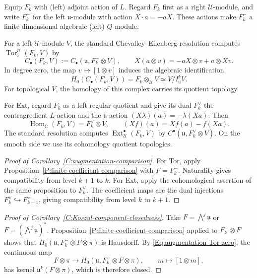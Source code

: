 \documentclass[a4paper,12pt]{amsart}
\numberwithin{equation}{section}
\theoremstyle{plain}
\theoremstyle{definition}
\theoremstyle{remark}
\begin{document}
Equip $F_k$ with (left) adjoint action of $L$.
Regard $F_k$ first as a right $\mathscr U$-module, and write $F_k^-$ for the left $\mathfrak u$-module with action $X\cdot a=-aX$.
These actions make $F_k^-$ a finite-dimensional algebraic (left) $Q$-module.

For a left $\mathscr U$-module $V$, the standard Chevalley--Eilenberg resolution computes $\operatorname{Tor}_i^{\mathscr U}(F_k,V)$ by
\begin{equation}\label{Eq:augmentation-Tor-complex}
 C_\bullet(F_k,V):=C_\bullet(\mathfrak u,F_k^-\otimes V),
 \qquad X(a\otimes v)=-aX\otimes v+a\otimes Xv.
\end{equation}
In degree zero, the map $v\mapsto[1\otimes v]$ induces the algebraic identification
\begin{equation}\label{Eq:augmentation-Tor-zero}
 H_0(C_\bullet(F_k,V))
 =F_k\otimes_{\mathscr U}V\simeq V/I_{\mathfrak u}^kV.
\end{equation}
For topological $V$, the homology of this complex carries its quotient topology.

For Ext, regard $F_k$ as a left regular quotient and give its dual $F_k^\vee$ the contragredient $L$-action and the $\mathfrak u$-action $(X\lambda)(a)=-\lambda(Xa)$.
Then
\[
 \operatorname{Hom}_{\mathbb C}(F_k,V)=F_k^\vee\otimes V,
 \qquad (Xf)(a)=Xf(a)-f(Xa).
\]
The standard resolution computes $\operatorname{Ext}_{\mathscr U}^\bullet(F_k,V)$ by $C^\bullet(\mathfrak u,F_k^\vee\otimes V)$.
On the smooth side we use its cohomology quotient topologies.

\begin{proof}[Proof of Corollary~\ref{C:augmentation-comparison}]
For Tor, apply Proposition~\ref{P:finite-coefficient-comparison} with $F=F_k^-$.
Naturality gives compatibility from level $k+1$ to $k$.
For Ext, apply the cohomological assertion of the same proposition to $F_k^\vee$.
The coefficient maps are the dual injections $F_k^\vee\hookrightarrow F_{k+1}^\vee$, giving compatibility from level $k$ to $k+1$.
\end{proof}

\begin{proof}[Proof of Corollary~\ref{C:Koszul-component-closedness}]
Take $F=\bigwedge^j\mathfrak u$ or $F=(\bigwedge^j\mathfrak u)^*$.
Proposition~\ref{P:finite-coefficient-comparison} applied to $F_k^-\otimes F$ shows that $H_0(\mathfrak u,F_k^-\otimes F\otimes\pi)$ is Hausdorff.
By \eqref{Eq:augmentation-Tor-zero}, the continuous map
\[
 F\otimes\pi\longrightarrow H_0(\mathfrak u,F_k^-\otimes F\otimes\pi),
 \qquad m\longmapsto[1\otimes m],
\]
has kernel $\mathfrak u^k(F\otimes\pi)$, which is therefore closed.
\end{proof}
\end{document}
